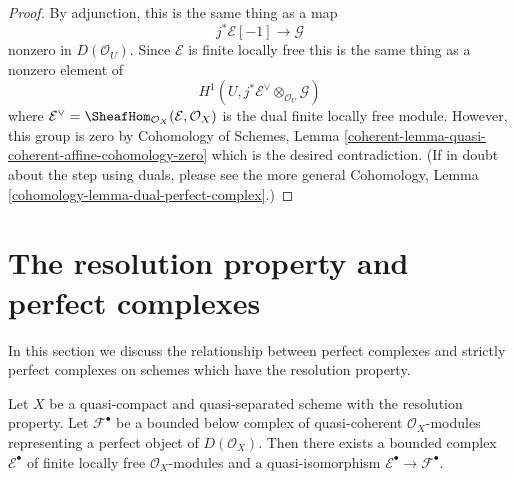 \begin{proof}
By adjunction, this is the same thing as a map
$$
j^*\mathcal{E}[-1] \to \mathcal{G}
$$
nonzero in $D(\mathcal{O}_U)$. Since $\mathcal{E}$ is finite locally
free this is the same thing as a nonzero element of
$$
H^1(U, j^*\mathcal{E}^\vee \otimes_{\mathcal{O}_U} \mathcal{G})
$$
where
$\mathcal{E}^\vee = \SheafHom_{\mathcal{O}_X}(\mathcal{E}, \mathcal{O}_X)$
is the dual finite locally free module. However, this group is zero by
Cohomology of Schemes, Lemma
\ref{coherent-lemma-quasi-coherent-affine-cohomology-zero}
which is the desired contradiction.
(If in doubt about the step using duals, please see the more general
Cohomology, Lemma \ref{cohomology-lemma-dual-perfect-complex}.)
\end{proof}






\section{The resolution property and perfect complexes}
\label{section-resolution-property-perfect}

\noindent
In this section we discuss the relationship between perfect complexes
and strictly perfect complexes on schemes which have the resolution property.

\begin{lemma}
\label{lemma-construct-strictly-perfect}
Let $X$ be a quasi-compact and quasi-separated scheme with the
resolution property.
Let $\mathcal{F}^\bullet$ be a bounded below complex of quasi-coherent
$\mathcal{O}_X$-modules representing a perfect object of
$D(\mathcal{O}_X)$. Then there exists a bounded complex
$\mathcal{E}^\bullet$ of finite locally free $\mathcal{O}_X$-modules
and a quasi-isomorphism $\mathcal{E}^\bullet \to \mathcal{F}^\bullet$.
\end{lemma}

